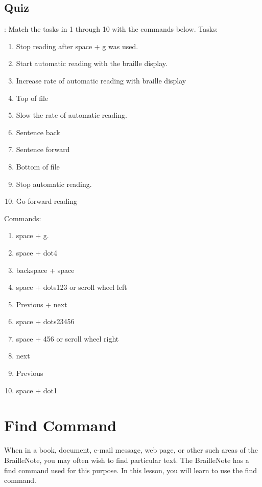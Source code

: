 \documentclass[10pt,letterpaper,twoside]{report}
\begin{document}
\clearpage
\subsection{Quiz}:
Match the tasks in 1 through 10 with the commands below.
Tasks:
\begin{enumerate}
	\item Stop reading after space + g was used.
	\item Start automatic reading with the braille display.
	\item Increase rate of automatic reading with braille display
	\item Top of file
	\item Slow the rate of automatic reading.
	\item Sentence back
	\item Sentence forward
	\item Bottom of file
	\item Stop automatic reading.
	\item Go forward reading
\end{enumerate}
Commands:
\begin{enumerate}
	\item space + g.
	\item space + dot4
	\item backspace + space
	\item space + dots123 or scroll wheel left
	\item Previous + next
	\item space + dots23456
	\item space + 456 or scroll wheel right
	\item next
	\item Previous
	\item space + dot1
\end{enumerate}
\clearpage
\section{Find Command}
When in a book, document, e-mail message, web page, or other such areas of the BrailleNote, you may often wish to find particular text. The BrailleNote has a find command used for this purpose. In this lesson, you will learn to use the find command.
\end{document}
